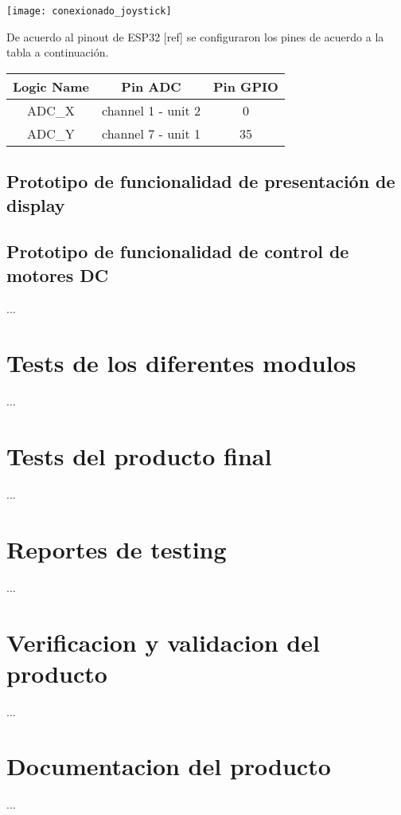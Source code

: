 \texttt{[image: conexionado\_joystick]}

De acuerdo al pinout de ESP32 [ref] se configuraron los pines de acuerdo a la tabla a continuación.

\begin{center}

\begin{tabular}{|c |c |c |} 
 \hline
 Logic Name & Pin ADC & Pin GPIO \\ [0.5ex] 
 \hline
 ADC_X & channel 1 - unit 2 & 0 \\ 
 ADC_Y & channel 7 - unit 1 & 35 \\ [1ex] 

 \hline
\end{tabular}

\end{center}

\subsection{Prototipo de funcionalidad de presentación de display}
 

\subsection{Prototipo de funcionalidad de control de motores DC}


...

\section{Tests de los diferentes modulos}
\label{sec:pruebasHW}

...

\section{Tests del producto final}
\label{sec:pruebasHW}

...

\section{Reportes de testing}
\label{sec:pruebasHW}

...

\section{Verificacion y validacion del producto}
\label{sec:pruebasHW}

...

\section{Documentacion del producto }
\label{sec:pruebasHW}

...



